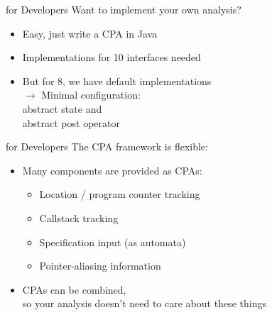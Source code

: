 
\begin{frame}{\cpacheckertitle for Developers}
  Want to implement your own analysis?
  \begin{itemize}
    \item Easy, just write a CPA in Java
    \item Implementations for 10 interfaces needed
    \item But for 8, we have default implementations\\
      \textbf{$\rightarrow$} Minimal configuration: \\
      \qquad abstract state and\\
      \qquad abstract post operator
  \end{itemize}
\end{frame}


\begin{frame}{\cpacheckertitle for Developers}
  The CPA framework is flexible:
  \begin{itemize}
    \item Many components are provided as CPAs:
      \begin{itemize}
        \item Location / program counter tracking
        \item Callstack tracking
        \item Specification input (as automata)
        \item Pointer-aliasing information
      \end{itemize}
    \item CPAs can be combined,\\
      so your analysis doesn't need to care about these things
  \end{itemize}
\end{frame}